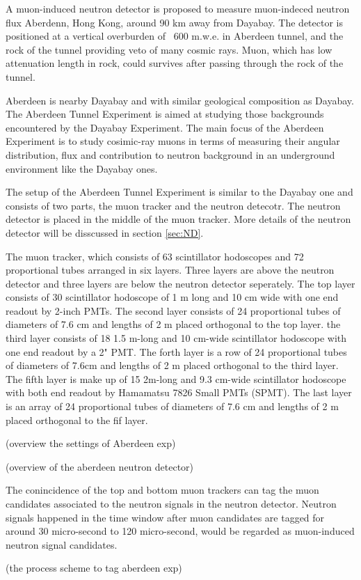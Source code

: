 
A muon-induced neutron detector is proposed to measure muon-indeced neutron flux Aberdenn, Hong Kong,
around 90 km away from Dayabay.
The detector is positioned at a vertical overburden of ~600 m.w.e. in Aberdeen tunnel, and the rock of the tunnel
providing veto of many cosmic rays. Muon, which has low attenuation length in rock, could
survives after passing through the rock of the tunnel.

Aberdeen is nearby Dayabay and with similar geological composition as Dayabay.
The Aberdeen Tunnel Experiment is aimed at studying those backgrounds encountered by the Dayabay
Experiment. The main focus of the Aberdeen Experiment is to study cosimic-ray muons in terms
of measuring their angular distribution, flux and contribution to neutron background in an
underground environment like the Dayabay ones.

The setup of the Aberdeen Tunnel Experiment is similar to the Dayabay one and consists of
two parts, the muon tracker and the neutron detecotr. The neutron detector is placed in the
middle of the muon tracker.
More details of the neutron detector will be disscussed in section \ref{sec:ND}.

The muon tracker, which consists of 63 scintillator hodoscopes and 72 proportional
tubes arranged in six layers.
Three layers are above the neutron detector and three layers are below the neutron detector seperately.
The top layer consists of 30 scintillator hodoscope of 1 m long and 10 cm wide with
one end readout by 2-inch PMTs. The second layer consists of 24 proportional tubes of diameters of
7.6 cm and lengths of 2 m placed orthogonal to the top layer. the third layer consists of 18 1.5 m-long
and 10 cm-wide scintillator hodoscope with one end readout by a 2" PMT. The forth layer is a row
of 24 proportional tubes of diameters of 7.6cm and lengths of 2 m placed orthogonal to the third layer.
The fifth layer is make up of 15 2m-long and 9.3 cm-wide scintillator hodoscope with both end
readout by Hamamatsu 7826 Small PMTs (SPMT). The last layer is an array of 24 proportional tubes
of diameters of 7.6 cm and lengths of 2 m placed  orthogonal to the fif layer.


(overview the settings of Aberdeen exp)


(overview of the aberdeen neutron detector)


The conincidence of the top and bottom muon trackers can tag the muon candidates
associated to the neutron signals in the neutron detector. Neutron signals happened
in the time window after muon candidates are tagged for around 30 micro-second to
120 micro-second, would be regarded as muon-induced neutron signal candidates.


(the process scheme to tag aberdeen exp)
